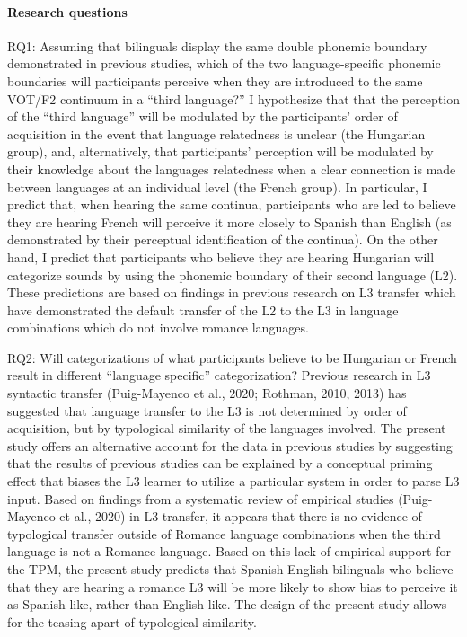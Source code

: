 \documentclass[
  english,
  man]{apa6}
\let\oldparagraph\paragraph
\renewcommand{\paragraph}[1]{\oldparagraph{#1}\mbox{}}
\begin{document}
\hypertarget{research-questions}{%
\paragraph{Research questions}\label{research-questions}}

RQ1: Assuming that bilinguals display the same double phonemic boundary demonstrated in previous studies, which of the two language-specific phonemic boundaries will participants perceive when they are introduced to the same VOT/F2 continuum in a \enquote{third language?}
I hypothesize that that the perception of the \enquote{third language} will be modulated by the participants' order of acquisition in the event that language relatedness is unclear (the Hungarian group), and, alternatively, that participants' perception will be modulated by their knowledge about the languages relatedness when a clear connection is made between languages at an individual level (the French group).
In particular, I predict that, when hearing the same continua, participants who are led to believe they are hearing French will perceive it more closely to Spanish than English (as demonstrated by their perceptual identification of the continua).
On the other hand, I predict that participants who believe they are hearing Hungarian will categorize sounds by using the phonemic boundary of their second language (L2).
These predictions are based on findings in previous research on L3 transfer which have demonstrated the default transfer of the L2 to the L3 in language combinations which do not involve romance languages.

RQ2: Will categorizations of what participants believe to be Hungarian or French result in different \enquote{language specific} categorization?
Previous research in L3 syntactic transfer (Puig-Mayenco et al., 2020; Rothman, 2010, 2013) has suggested that language transfer to the L3 is not determined by order of acquisition, but by typological similarity of the languages involved.
The present study offers an alternative account for the data in previous studies by suggesting that the results of previous studies can be explained by a conceptual priming effect that biases the L3 learner to utilize a particular system in order to parse L3 input.
Based on findings from a systematic review of empirical studies (Puig-Mayenco et al., 2020) in L3 transfer, it appears that there is no evidence of typological transfer outside of Romance language combinations when the third language is not a Romance language.
Based on this lack of empirical support for the TPM, the present study predicts that Spanish-English bilinguals who believe that they are hearing a romance L3 will be more likely to show bias to perceive it as Spanish-like, rather than English like.
The design of the present study allows for the teasing apart of typological similarity.
\end{document}
